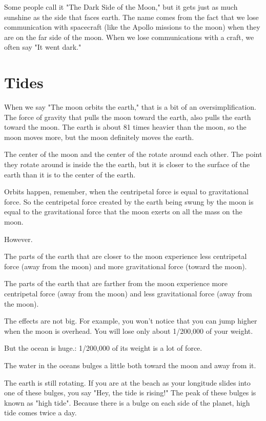 Some people call it "The Dark Side of the Moon," but it gets just as much sunshine as the side that faces earth.  The name comes from the fact that we lose communication with spacecraft (like the Apollo missions to the moon) when they are on the far side of the moon.  When we lose communications with a craft, 
we often say "It went dark."

\section{Tides}

When we say "The moon orbits the earth,"  that is a bit of an oversimplification.  The force of gravity that pulls the moon toward the earth,  also pulls the earth toward the moon.   The earth is about 81 times heavier
than the moon,  so the moon moves more, but the moon definitely moves the earth.

The center of the moon and the center of the rotate around each other.  The point they rotate around is inside the the earth,  but it is closer to the surface of the earth than it is to the center of the earth.

Orbits happen, remember, when the centripetal force is equal to gravitational force.  So the centripetal force created by the earth being swung by the moon is equal to the gravitational force that the moon exerts on all the mass on the moon.

However.  

The parts of the earth that are closer to the moon experience less centripetal force (away from the moon) and more gravitational force (toward the moon).

The parts of the earth that are farther from the moon experience more centripetal force (away from the moon) and less gravitational force (away from the moon).   

The effects are not big.  For example,  you won't notice that you can jump higher when the moon is 
overhead.  You will lose only about 1/200,000 of your weight.

But the ocean is huge.: 1/200,000 of its weight is a lot of force.

The water in the oceans bulges a little both toward the moon and away from it.

The earth is still rotating.  If you are at the beach as your longitude slides into one of these bulges,   you say "Hey, the tide is rising!"  The peak of these bulges is known as "high tide".  Because there is a bulge on each 
side of the planet,  high tide comes twice a day.

